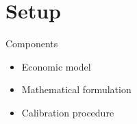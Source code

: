 \section{Setup}
\begin{frame}{Components}\vspace{0.25cm}

\begin{itemize}\setlength\itemsep{1em}
\item Economic model
\item Mathematical formulation
\item Calibration procedure
\end{itemize}
\end{frame}





